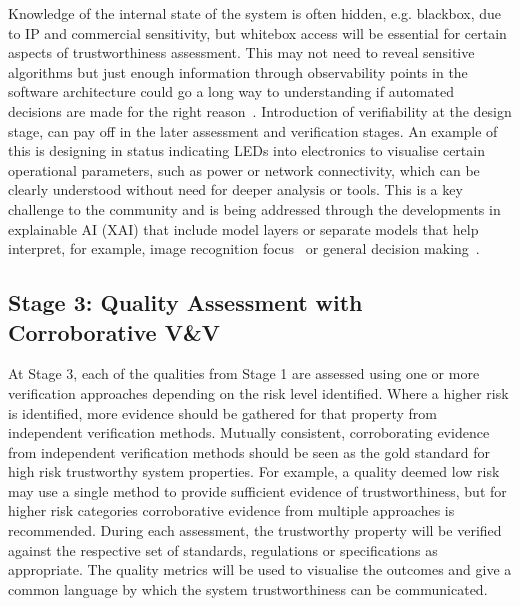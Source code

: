 Knowledge of the internal state of the system is often hidden, e.g. blackbox, due to IP and commercial sensitivity, but whitebox access will be essential for certain aspects of trustworthiness assessment. This may not need to reveal sensitive algorithms but just enough information through observability points in the software architecture could go a long way to understanding if automated decisions are made for the right reason~\cite{koopman2018toward}. 
%
Introduction of verifiability at the design stage, can pay off in the later assessment and verification stages. An example of this is designing in status indicating LEDs into electronics to visualise certain operational parameters, such as power or network connectivity, which can be clearly understood without need for deeper analysis or tools. 
%
This is a key challenge to the community and is being addressed through the developments in explainable AI (XAI) that include model layers or separate models that help interpret, for example, image recognition focus~\cite{petsiuk2021black} or general decision making~\cite{danilevsky2020survey, gunning2019xai}. 


\subsection{Stage 3: Quality Assessment with Corroborative V\&V}

At Stage 3, each of the qualities from Stage 1 are assessed using one or more verification approaches depending on the risk level identified. Where a higher risk is identified, more evidence should be gathered for that property from independent verification methods. Mutually consistent, corroborating evidence from independent verification methods should be seen as the gold standard for high risk trustworthy system properties. 
%
For example, a quality deemed low risk may use a single method to provide sufficient evidence of trustworthiness, but for higher risk categories corroborative evidence from multiple approaches is recommended. 
%
During each assessment, the trustworthy property will be verified against the respective set of standards, regulations or specifications as appropriate. The quality metrics will be used to visualise the outcomes and give a common language by which the system trustworthiness can be communicated. 

